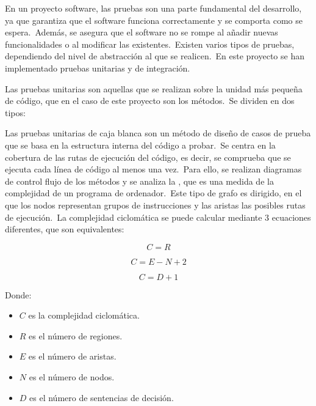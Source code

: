 
En un proyecto software, las pruebas son una parte fundamental del desarrollo, ya que garantiza que el software funciona
correctamente y se comporta como se espera.\ Además, se asegura que el software no se rompe al añadir nuevas
funcionalidades o al modificar las existentes.\ Existen varios tipos de pruebas, dependiendo del nivel de abstracción
al que se realicen.\ En este proyecto se han implementado pruebas unitarias y de integración.


Las pruebas unitarias son aquellas que se realizan sobre la unidad más pequeña de código, que en el caso de este
proyecto son los métodos.\ Se dividen en dos tipos:


Las pruebas unitarias de caja blanca son un método de diseño de casos de prueba que se basa en la estructura interna
del código a probar.\ Se centra en la cobertura de las rutas de ejecución del código, es decir, se comprueba que se
ejecuta cada línea de código al menos una vez.\ Para ello, se realizan diagramas de control flujo de los métodos y se
analiza la , que es una medida de la complejidad de un programa de
ordenador.\ Este tipo de grafo es dirigido, en el que los
nodos representan grupos de instrucciones y las aristas las posibles rutas de ejecución.\ La complejidad ciclomática
se puede calcular mediante 3 ecuaciones diferentes, que son equivalentes:

\begin{center}
	\begin{equation}
		C = R
		\label{eq:complejidad-ciclomatica-1}
	\end{equation}

	\begin{equation}
		C = E - N + 2
		\label{eq:complejidad-ciclomatica-2}
	\end{equation}

	\begin{equation}
		C = D + 1
		\label{eq:complejidad-ciclomatica-3}
	\end{equation}
\end{center}

Donde:
\begin{itemize}
	\item $C$ es la complejidad ciclomática.
	\item $R$ es el número de regiones.
	\item $E$ es el número de aristas.
	\item $N$ es el número de nodos.
	\item $D$ es el número de sentencias de decisión.
\end{itemize}

